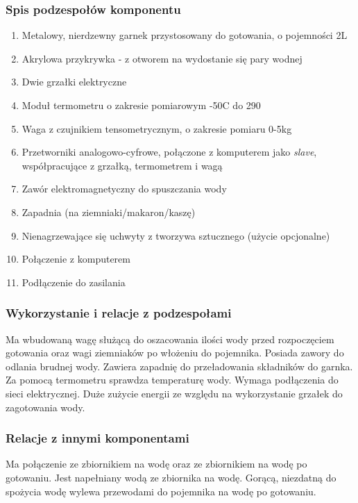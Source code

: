 \documentclass[12pt,a4paper,notitlepage]{article}
\begin{document}
\subsubsection{Spis podzespołów komponentu}
\begin{enumerate}
  \item Metalowy, nierdzewny garnek przystosowany do gotowania, o pojemności 2L
  \item Akrylowa przykrywka - z otworem na wydostanie się pary wodnej
  \item Dwie grzałki elektryczne
  \item Moduł termometru o zakresie pomiarowym -50\degree C do 290\degree
  \item Waga z czujnikiem tensometrycznym, o zakresie pomiaru 0-5kg
  \item Przetworniki analogowo-cyfrowe, połączone z komputerem jako \emph{slave}, współpracujące z grzałką, termometrem i wagą
  \item Zawór elektromagnetyczny do spuszczania wody
  \item Zapadnia (na ziemniaki/makaron/kaszę)
  \item Nienagrzewające się uchwyty z tworzywa sztucznego (użycie opcjonalne)
  \item Połączenie z komputerem
  \item Podłączenie do zasilania
\end{enumerate}
 
\subsubsection{Wykorzystanie i relacje z podzespołami}
Ma wbudowaną wagę służącą do oszacowania ilości wody przed rozpoczęciem gotowania oraz wagi ziemniaków po włożeniu do pojemnika. Posiada zawory do odlania brudnej wody. Zawiera zapadnię do przeładowania składników do garnka. Za pomocą termometru sprawdza temperaturę wody. Wymaga podłączenia do sieci elektrycznej. Duże zużycie energii ze względu na wykorzystanie grzałek do zagotowania wody.

\subsubsection{Relacje z innymi komponentami}
Ma połączenie ze zbiornikiem na wodę oraz ze zbiornikiem na wodę po gotowaniu. Jest napełniany wodą ze zbiornika na wodę. Gorącą, niezdatną do spożycia wodę wylewa przewodami do pojemnika na wodę po gotowaniu.
\end{document}
